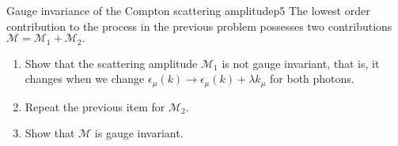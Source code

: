 \begin{problem}{Gauge invariance of the Compton scattering amplitude}{p5}
   The lowest order contribution to the process in the previous problem possesses two contributions \(\mathcal{M} = \mathcal{M}_1 + \mathcal{M}_2.\) 
   \begin{enumerate}[label=(\alph*)]
      \item Show that the scattering amplitude \(\mathcal{M}_1\) is not gauge invariant, that is, it changes when we change \(\epsilon_\mu(k) \to \epsilon_\mu(k) + \lambda k_\mu\) for both photons.
      \item Repeat the previous item for \(\mathcal{M}_2.\)
      \item Show that \(\mathcal{M}\) is gauge invariant.
   \end{enumerate}
\end{problem}
